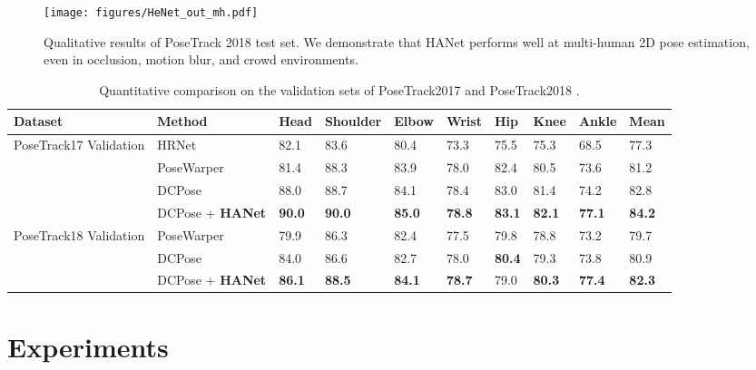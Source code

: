 \documentclass[10pt,twocolumn,letterpaper]{article}
\begin{document}
\begin{figure*}[t]
\centering
\texttt{[image: figures/HeNet\_out\_mh.pdf]}
\caption{Qualitative results of PoseTrack 2018 test set. We demonstrate that HANet performs well at multi-human 2D pose estimation, even in occlusion, motion blur, and crowd environments.
}
\label{fig:complex scene}
\end{figure*}

\setlength{\tabcolsep}{5.9pt}
\begin{table*}[]
\begin{center}
\begin{tabular}{l|l|lllllll|l}
\toprule
Dataset & Method                        & Head & Shoulder & Elbow & Wrist & Hip & Knee & Ankle & Mean\\ \midrule
\multirow{4}{*}{PoseTrack17 Validation \cite{posetrack2017}}  
& HRNet \cite{hrnet}        & 82.1 & 83.6 & 80.4 & 73.3 & 75.5 & 75.3 & 68.5 & 77.3 \\
& PoseWarper \cite{posewarper}& 81.4 & 88.3 & 83.9 & 78.0 & 82.4 & 80.5 & 73.6 & 81.2 \\
& DCPose \cite{dcpose}      & 88.0 & 88.7 & 84.1 & 78.4 & 83.0 & 81.4 & 74.2 & 82.8 \\
& DCPose + \textbf{HANet}   & \textbf{90.0} & \textbf{90.0} & \textbf{85.0} & \textbf{78.8} & \textbf{83.1} & \textbf{82.1} & \textbf{77.1} & \textbf{84.2} \\ \midrule
\multirow{3}{*}{PoseTrack18 Validation \cite{posetrack2018}} 
& PoseWarper \cite{posewarper}  & 79.9 & 86.3   & 82.4  & 77.5  & 79.8 & 78.8 & 73.2  & 79.7 \\
& DCPose \cite{dcpose}          & 84.0 & 86.6     & 82.7  & 78.0  & \textbf{80.4} & 79.3 & 73.8  & 80.9 \\ 
& DCPose + \textbf{HANet} & \textbf{86.1} & \textbf{88.5} & \textbf{84.1} & \textbf{78.7} & 79.0 & \textbf{80.3} & \textbf{77.4} & \textbf{82.3}\\\bottomrule
\end{tabular}
\end{center}
\caption{Quantitative comparison on the validation sets of PoseTrack2017 \cite{posetrack2017}  and PoseTrack2018 \cite{posetrack2018}.}
\label{table:2017 validation and test set}
\end{table*}

\section{Experiments}
\end{document}
